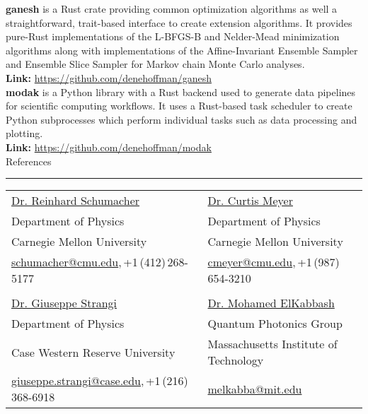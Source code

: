\documentclass[letterpaper,11pt,oneside]{article}
\newcommand{\sectionheader}[1]{%
{\Large{#1}}
\vspace{2ex}
\hrule
\vspace{2ex}
}
\begin{document}
\textbf{ganesh} is a Rust crate providing common optimization algorithms as well a straightforward, trait-based interface to create extension algorithms. It provides pure-Rust implementations of the L-BFGS-B and Nelder-Mead minimization algorithms along with implementations of the Affine-Invariant Ensemble Sampler and Ensemble Slice Sampler for Markov chain Monte Carlo analyses.\\
\textbf{Link:} \href{https://github.com/denehoffman/ganesh}{https://github.com/denehoffman/ganesh}\\

\textbf{modak} is a Python library with a Rust backend used to generate data pipelines for scientific computing workflows. It uses a Rust-based task scheduler to create Python subprocesses which perform individual tasks such as data processing and plotting.\\
\textbf{Link:} \href{https://github.com/denehoffman/modak}{https://github.com/denehoffman/modak}\\


\sectionheader{References}
\noindent \begin{tabular}{@{} l l}
 \href{http://www-meg.phys.cmu.edu/~schumach/}{Dr. Reinhard Schumacher} & \href{http://www.curtismeyer.com/index.php/main}{Dr. Curtis Meyer} \\
 Department of Physics &  Department of Physics  \\
 Carnegie Mellon University &  Carnegie Mellon University \\
 \small{\href{mailto:schumacher@cmu.edu}{schumacher@cmu.edu},\,+1\,(412)\,268-5177} & \small{\href{mailto:cmeyer@cmu.edu}{cmeyer@cmu.edu},\,+1\,(987)\,654-3210} \\
& \\
 \href{http://nanoplasm.wrphysics.org/}{Dr. Giuseppe Strangi} & \href{https://scholar.google.com/citations?user=bhQY_u8AAAAJ&hl=en}{Dr. Mohamed ElKabbash}  \\
 Department of Physics &  Quantum Photonics Group\\
 Case Western Reserve University &  Massachusetts Institute of Technology \\
 \small{\href{mailto:giuseppe.strangi@case.edu}{giuseppe.strangi@case.edu},\,+1\,(216)\,368-6918} & \small{\href{mailto:melkabba@mit.edu}{melkabba@mit.edu}} \\
\end{tabular}
\end{document}
